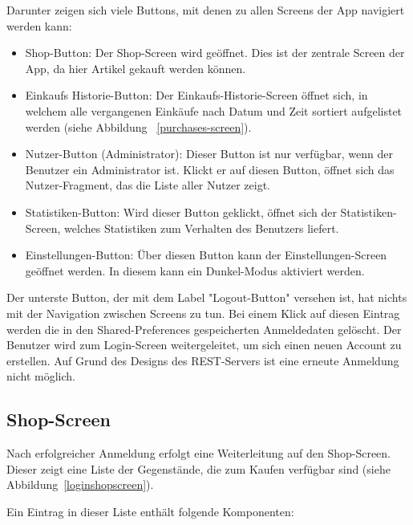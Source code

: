 Darunter zeigen sich viele Buttons, mit denen zu allen Screens der App navigiert werden kann:

\begin{itemize}
	\item Shop-Button: Der Shop-Screen wird geöffnet.
	Dies ist der zentrale Screen der App, da hier Artikel gekauft werden können.

	\item Einkaufs Historie-Button: Der Einkaufs-Historie-Screen öffnet sich, in welchem alle vergangenen Einkäufe nach Datum und Zeit sortiert aufgelistet werden (siehe Abbildung ~\ref{purchases-screen}).

	\item Nutzer-Button (Administrator): Dieser Button ist nur verfügbar, wenn der Benutzer ein Administrator ist.
	Klickt er auf diesen Button, öffnet sich das Nutzer-Fragment, das die Liste aller Nutzer zeigt.

	\item Statistiken-Button: Wird dieser Button geklickt, öffnet sich der Statistiken-Screen, welches Statistiken zum Verhalten des Benutzers liefert.

	\item Einstellungen-Button: Über diesen Button kann der Einstellungen-Screen geöffnet werden.
	In diesem kann ein Dunkel-Modus aktiviert werden.

\end{itemize}

Der unterste Button, der mit dem Label "Logout-Button" versehen ist, hat nichts mit der Navigation zwischen Screens zu tun.
Bei einem Klick auf diesen Eintrag werden die in den Shared-Preferences gespeicherten Anmeldedaten gelöscht.
Der Benutzer wird zum Login-Screen weitergeleitet, um sich einen neuen Account zu erstellen.
Auf Grund des Designs des REST-Servers ist eine erneute Anmeldung nicht möglich.

\subsection{Shop-Screen}\label{subsec:shop-screen}

Nach erfolgreicher Anmeldung erfolgt eine Weiterleitung auf den Shop-Screen.
Dieser zeigt eine Liste der Gegenstände, die zum Kaufen verfügbar sind (siehe Abbildung~\ref{loginshopscreen}).

Ein Eintrag in dieser Liste enthält folgende Komponenten:

